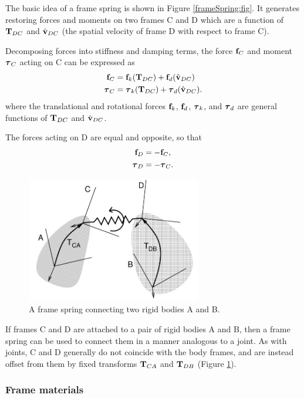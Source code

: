 The basic idea of a frame spring is shown in Figure
\ref{frameSpring:fig}. It generates restoring forces and moments on
two frames C and D which are a function of ${\bf T}_{DC}$ and $\hat{{\bf v}}_{DC}$
(the spatial velocity of frame D with respect to frame C).

Decomposing forces into stiffness and damping terms, the force
${\bf f}_C$ and moment $\boldsymbol\tau_C$ acting on C can be expressed as 
%
\begin{align}
{\bf f}_C & = {\bf f}_{k} ({\bf T}_{DC}) + {\bf f}_{d} (\hat{{\bf v}}_{DC}) \notag \\
\boldsymbol\tau_C & = \boldsymbol\tau_{k} ({\bf T}_{DC}) + \boldsymbol\tau_{d} (\hat{{\bf v}}_{DC}).
\label{ftauC:eqn}
\end{align}
%
where the translational and rotational forces ${\bf f}_{k}$, ${\bf f}_{d}$,
$\boldsymbol\tau_{k}$, and $\boldsymbol\tau_{d}$ are general functions of ${\bf T}_{DC}$ and
$\hat{{\bf v}}_{DC}$.

The forces acting on D are equal and opposite, so that
%
\begin{align}
{\bf f}_D & = - {\bf f}_C, \notag \\
\boldsymbol\tau_D & = - \boldsymbol\tau_C.
\label{ftau2:eqn}
\end{align}
%

\begin{figure}[ht]
\begin{center}
 \includegraphics[width=3in]{images/frameSpringBodies}
\end{center}
\caption{A frame spring connecting two rigid bodies A and B.}
\label{frameSpringBodies:fig}
\end{figure}

If frames C and D are attached to a pair of rigid bodies A and B, then
a frame spring can be used to connect them in a manner analogous to a
joint. As with joints, C and D generally do not coincide with the body
frames, and are instead offset from them by fixed transforms ${\bf T}_{CA}$
and ${\bf T}_{DB}$ (Figure \ref{frameSpringBodies:fig}).

\subsubsection{Frame materials}

